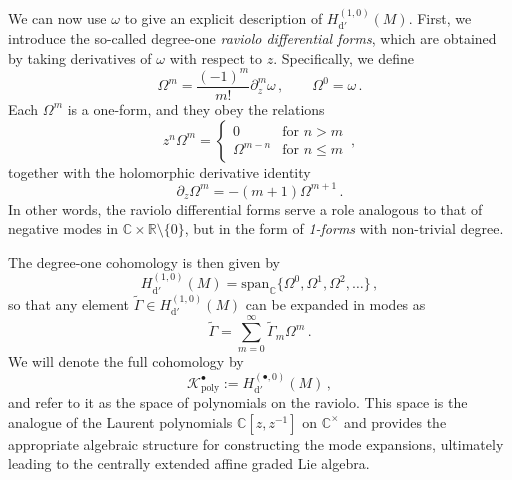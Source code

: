 \documentclass[11pt]{amsart}
\newcommand{\R}{{\mathbb R}}
\newcommand{\C}{{\mathbb C}}
\numberwithin{equation}{section}
\numberwithin{figure}{section}
\numberwithin{table}{section}
\theoremstyle{thm}
\numberwithin{equation}{subsection}
\theoremstyle{definition}
\theoremstyle{rem}
\begin{document}
We can now use \(\omega\) to give an explicit description of 
\(H^{(1,0)}_{\mathrm{d}'}(M)\). First, we introduce the so-called degree-one 
\emph{raviolo differential forms}, which are obtained by taking derivatives of 
\(\omega\) with respect to \(z\). Specifically, we define
\begin{equation}
\label{ec:Omegadef}
    \Omega^m = \frac{(-1)^m}{m!} \partial_z^m \omega\,,\qquad \Omega^0=\omega\,.
\end{equation}
Each \(\Omega^m\) is a one-form, and they obey the relations
\begin{equation}
\label{ec:zntimesomegam}
    z^n \Omega^m = 
    \begin{cases}
        0 & \text{for } n > m \\
        \Omega^{m-n} & \text{for } n \leq m
    \end{cases}\,,
\end{equation}
together with the holomorphic derivative identity 
\begin{equation}
\label{ec:holoderivative} 
    \partial_z \Omega^m = -(m+1)\Omega^{m+1}\,.
\end{equation}
In other words, the raviolo differential forms serve a role analogous to that of negative modes in $\C \times \R\setminus\{0\}$, but in the form of \textit{1-forms} with non-trivial degree. 


The degree-one cohomology is then given by \cite{Garner:2023zqn}
\begin{equation}
    H^{(1,0)}_{\mathrm{d}'}(M) = \mathrm{span}_{\mathbb{C}} \{ \Omega^0, \Omega^1, \Omega^2, \dots \}\,,
\end{equation}
so that any element \(\tilde{\Gamma} \in H^{(1,0)}_{\mathrm{d}'}(M)\) can be 
expanded in modes as
\begin{equation}
    \tilde{\Gamma} = \sum_{m=0}^\infty \tilde{\Gamma}_m \Omega^m\,.
\end{equation}
We will denote the full cohomology by
\begin{equation}
\label{ec:ravpoly}
    \mathcal{K}^\bullet_{\text{poly}} := H^{(\bullet,0)}_{\mathrm{d}'}(M)\,,
\end{equation}
and refer to it as the space of polynomials on the raviolo. This space is the 
analogue of the Laurent polynomials \(\mathbb{C}[z, z^{-1}]\) on 
\(\mathbb{C}^\times\) and provides the appropriate algebraic structure for 
constructing the mode expansions, ultimately leading to the centrally extended affine graded Lie algebra. 
\end{document}

